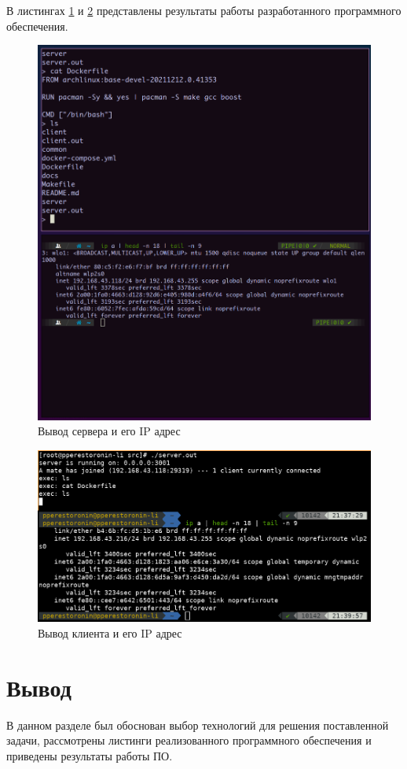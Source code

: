 В листингах \ref{fig:example_01} и \ref{fig:example_02} представлены результаты работы разработанного программного обеспечения.

\begin{center}
	\begin{figure}[h]
		\begin{center}
			\includegraphics[scale=0.5]{img/example_01.png}
		\end{center}
		\caption{\label{fig:example_01} Вывод сервера и его IP адрес}
	\end{figure}
\end{center}

\begin{center}
	\begin{figure}[h]
		\begin{center}
			\includegraphics[scale=0.5]{img/example_02.png}
		\end{center}
		\caption{\label{fig:example_02} Вывод клиента и его IP адрес}
	\end{figure}
\end{center}


\section*{Вывод}

В данном разделе был обоснован выбор технологий для решения поставленной задачи, рассмотрены листинги реализованного программного обеспечения и приведены результаты работы ПО.